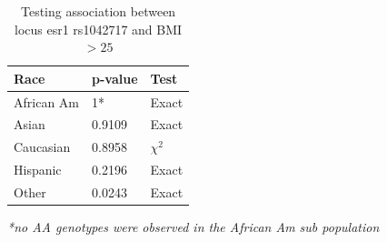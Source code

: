 \documentclass{article}
\begin{document}
	\begin{table}[H]
		\centering
		\begin{tabular}{lll}
			Race       & p-value & Test     \\ \hline
			African Am & 1*      & Exact    \\
			Asian      & 0.9109  & Exact    \\
			Caucasian  & 0.8958  & $\chi^2$ \\
			Hispanic   & 0.2196  & Exact    \\
			Other      & 0.0243  & Exact   
		\end{tabular}
		\caption{Testing association between locus esr1 rs1042717 and BMI $> 25$} \label{tab2:title}
	\end{table}
	
	\emph{*no AA genotypes were observed in the African Am sub population}
	
\end{document}
